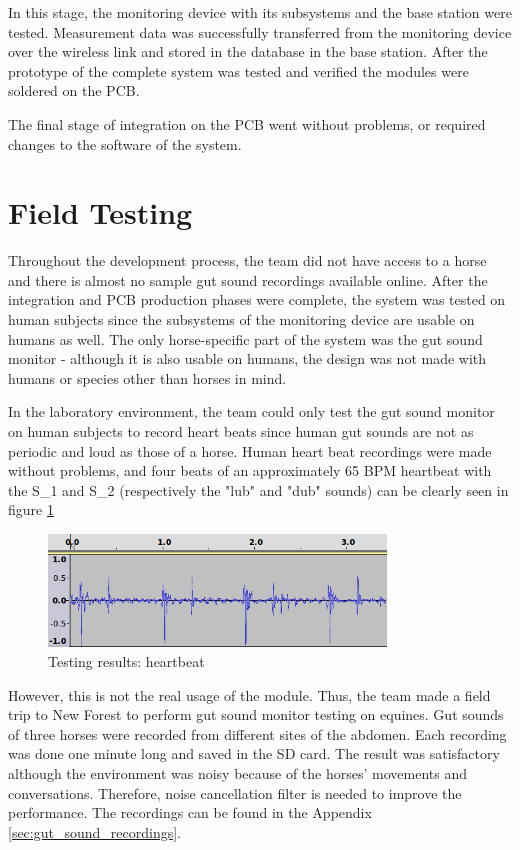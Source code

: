 In this stage, the monitoring device with its subsystems and the base station were tested. Measurement data was successfully transferred from the monitoring device over the wireless link and stored in the database in the base station. After the prototype of the complete system was tested and verified the modules were soldered on the PCB.

The final stage of integration on the PCB went without problems, or required changes to the software of the system.  



\section{Field Testing}
Throughout the development process, the team did not have access to a horse and there is almost no sample gut sound recordings available online. After the integration and PCB production phases were complete, the system was tested on human subjects since the subsystems of the monitoring device are usable on humans as well. The only horse-specific part of the system was the gut sound monitor - although it is also usable on humans, the design was not made with humans or species other than horses in mind. 

In the laboratory environment, the team could only test the gut sound monitor on human subjects to record heart beats since human gut sounds are not as periodic and loud as those of a horse. Human heart beat recordings were made without problems, and four beats of an approximately 65 BPM heartbeat with the S\_1 and S\_2 (respectively the "lub" and "dub" sounds) can be clearly seen in figure \ref{fig:heartbeat}

\begin{figure}
\centering
\includegraphics[width=0.8\textwidth]{Images/heartbeat.png}
\caption{Testing results: heartbeat}
\label{fig:heartbeat}
\end{figure}

However, this is not the real usage of the module. Thus, the team made a field trip to New Forest to perform gut sound monitor testing on equines. Gut sounds of three horses were recorded from different sites of the abdomen. Each recording was done one minute long and saved in the SD card. The result was satisfactory although the environment was noisy because of the horses' movements and conversations. Therefore, noise cancellation filter is needed to improve the performance. The recordings can be found in the Appendix \ref{sec:gut_sound_recordings}.



